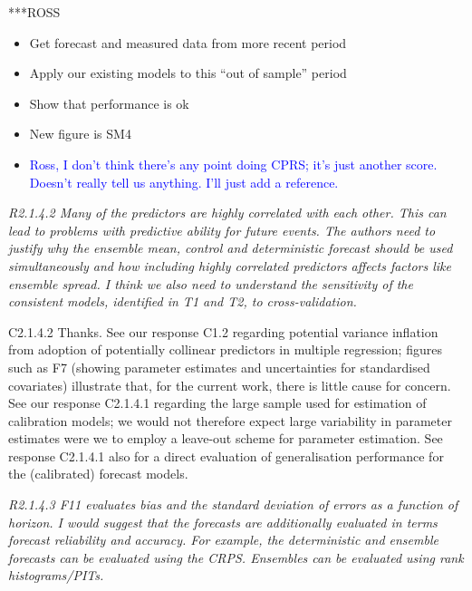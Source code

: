 \documentclass[a4paper,10pt]{article}
\begin{document}
	***ROSS
	\begin{itemize}
		\item Get forecast and measured data from more recent period
		\item Apply our existing models to this ``out of sample'' period
		\item Show that performance is ok
		\item New figure is SM4
		\item \textcolor{blue}{Ross, I don't think there's any point doing CPRS; it's just another score. Doesn't really tell us anything. I'll just add a reference.}
	\end{itemize}
	
	\emph{R2.1.4.2 Many of the predictors are highly correlated with each other. This can lead to problems with predictive ability for future events. The authors need to justify why the ensemble mean, control and deterministic forecast should be used simultaneously and how including highly correlated predictors affects factors like ensemble spread. I think we also need to understand the sensitivity of the consistent models, identified in T1 and T2, to cross-validation.}
	
	C2.1.4.2 Thanks. See our response C1.2 regarding potential variance inflation from adoption of potentially collinear predictors in multiple regression; figures such as F7 (showing parameter estimates and uncertainties for standardised covariates) illustrate that, for the current work, there is little cause for concern. See our response C2.1.4.1 regarding the large sample used for estimation of calibration models; we would not therefore expect large variability in parameter estimates were we to employ a leave-out scheme for parameter estimation. See response C2.1.4.1 also for a direct evaluation of generalisation performance for the (calibrated) forecast models.
	
	\emph{R2.1.4.3 F11 evaluates bias and the standard deviation of errors as a function of horizon. I would suggest that the forecasts are additionally evaluated in terms forecast reliability and accuracy. For example, the deterministic and ensemble forecasts can be evaluated using the CRPS. Ensembles can be evaluated using rank histograms/PITs.}
	
\end{document}
